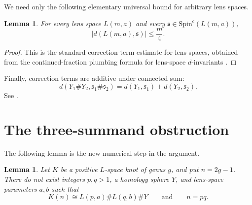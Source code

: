 \documentclass[11pt]{article}
\newtheorem{lemma}[theorem]{Lemma}
\theoremstyle{definition}
\theoremstyle{remark}
\newcommand{\SpinC}{\mathrm{Spin}^{c}}
\begin{document}
We need only the following elementary universal bound for arbitrary lens
spaces.

\begin{lemma}\label{lem:lens-bound}
For every lens space $L(m,a)$ and every $\mathfrak s\in\SpinC(L(m,a))$,
\[
\left|d(L(m,a),\mathfrak s)\right|\le \frac m4.
\]
\end{lemma}

\begin{proof}
This is the standard correction-term estimate for lens spaces, obtained
from the continued-fraction plumbing formula for lens-space $d$-invariants
\cite{OSAbs}.
\end{proof}

Finally, correction terms are additive under connected sum:
\begin{equation}\label{eq:connected-sum-d}
d(Y_1\#Y_2,\mathfrak s_1\#\mathfrak s_2)
=
d(Y_1,\mathfrak s_1)+d(Y_2,\mathfrak s_2).
\end{equation}
See \cite{OSAbs}.

\section{The three-summand obstruction}

The following lemma is the new numerical step in the argument.

\begin{lemma}\label{lem:d-obstruction}
Let $K$ be a positive $L$-space knot of genus $g$, and put $n=2g-1$.
There do not exist integers $p,q>1$, a homology sphere $Y$, and lens-space
parameters $a,b$ such that
\[
K(n)\cong L(p,a)\#L(q,b)\#Y
\qquad\text{and}\qquad
n=pq.
\]
\end{lemma}
\end{document}
